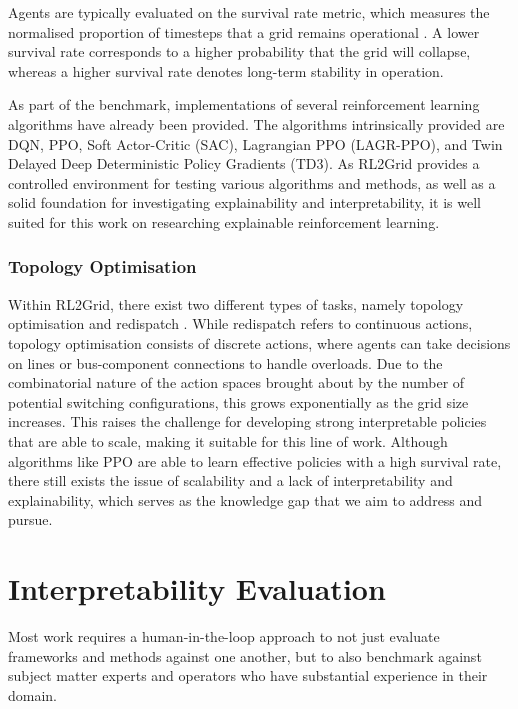 Agents are typically evaluated on the survival rate metric, which measures the normalised proportion of timesteps that a grid remains operational \cite{marchesini2025rl2grid}. A lower survival rate corresponds to a higher probability that the grid will collapse, whereas a higher survival rate denotes long-term stability in operation.

As part of the benchmark, implementations of several reinforcement learning algorithms have already been provided. The algorithms intrinsically provided are DQN, PPO, Soft Actor-Critic (SAC), Lagrangian PPO (LAGR-PPO), and Twin Delayed Deep Deterministic Policy Gradients (TD3). As RL2Grid provides a controlled environment for testing various algorithms and methods, as well as a solid foundation for investigating explainability and interpretability, it is well suited for this work on researching explainable reinforcement learning. 

\subsubsection{Topology Optimisation}

Within RL2Grid, there exist two different types of tasks, namely topology optimisation and redispatch \cite{marchesini2025rl2grid}. While redispatch refers to continuous actions, topology optimisation consists of discrete actions, where agents can take decisions on lines or bus-component connections to handle overloads. Due to the combinatorial nature of the action spaces brought about by the number of potential switching configurations, this grows exponentially as the grid size increases. This raises the challenge for developing strong interpretable policies that are able to scale, making it suitable for this line of work. Although algorithms like PPO are able to learn effective policies with a high survival rate, there still exists the issue of scalability and a lack of interpretability and explainability, which serves as the knowledge gap that we aim to address and pursue.

\section{Interpretability Evaluation}

Most work requires a human-in-the-loop approach to not just evaluate frameworks and methods against one another, but to also benchmark against subject matter experts and operators who have substantial experience in their domain.


